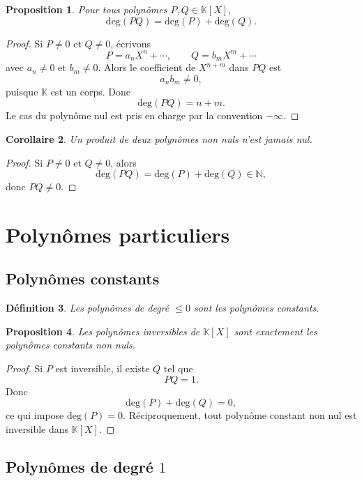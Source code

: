 \documentclass[11pt,a4paper]{article}
\newtheorem{definition}{Définition}[section]
\newtheorem{proposition}[definition]{Proposition}
\newtheorem{corollaire}[definition]{Corollaire}
\theoremstyle{remark}
\newcommand{\N}{\mathbb{N}}
\newcommand{\K}{\mathbb{K}}
\newcommand{\degP}{\mathrm{deg}}
\begin{document}
\begin{proposition}
Pour tous polynômes \(P,Q\in\K[X]\),
\[
\degP(PQ)=\degP(P)+\degP(Q).
\]
\end{proposition}

\begin{proof}
Si \(P\neq 0\) et \(Q\neq 0\), écrivons
\[
P=a_nX^n+\cdots,\qquad Q=b_mX^m+\cdots
\]
avec \(a_n\neq 0\) et \(b_m\neq 0\). Alors le coefficient de \(X^{n+m}\) dans \(PQ\) est
\[
a_nb_m\neq 0,
\]
puisque \(\K\) est un corps. Donc
\[
\degP(PQ)=n+m.
\]
Le cas du polynôme nul est pris en charge par la convention \(-\infty\).
\end{proof}

\begin{corollaire}
Un produit de deux polynômes non nuls n’est jamais nul.
\end{corollaire}

\begin{proof}
Si \(P\neq 0\) et \(Q\neq 0\), alors
\[
\degP(PQ)=\degP(P)+\degP(Q)\in\N,
\]
donc \(PQ\neq 0\).
\end{proof}

\section{Polynômes particuliers}

\subsection{Polynômes constants}

\begin{definition}
Les polynômes de degré \(\le 0\) sont les polynômes constants.
\end{definition}

\begin{proposition}
Les polynômes inversibles de \(\K[X]\) sont exactement les polynômes constants non nuls.
\end{proposition}

\begin{proof}
Si \(P\) est inversible, il existe \(Q\) tel que
\[
PQ=1.
\]
Donc
\[
\degP(P)+\degP(Q)=0,
\]
ce qui impose \(\degP(P)=0\). Réciproquement, tout polynôme constant non nul est inversible dans \(\K[X]\).
\end{proof}

\subsection{Polynômes de degré \(1\)}
\end{document}
